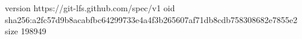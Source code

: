 version https://git-lfs.github.com/spec/v1
oid sha256:a2fc57d9b8acabfbc64299733e4a4f3b265607af71db8cdb758308682e7855e2
size 198949
